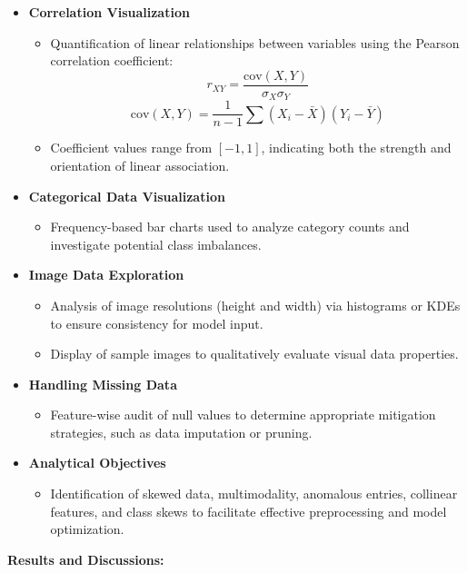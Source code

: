 \documentclass[11pt]{article}
\begin{document}
\begin{itemize}
    \item \textbf{Correlation Visualization}
    \begin{itemize}
        \item Quantification of linear relationships between variables using the Pearson correlation coefficient:
        \[
        r_{XY} = \frac{\text{cov}(X,Y)}{\sigma_X \sigma_Y}
        \]
        \[
        \text{cov}(X,Y) = \frac{1}{n-1} \sum (X_i - \bar{X})(Y_i - \bar{Y})
        \]
        \item Coefficient values range from $[-1, 1]$, indicating both the strength and orientation of linear association.
    \end{itemize}
     
    \item \textbf{Categorical Data Visualization}
    \begin{itemize}
        \item Frequency-based bar charts used to analyze category counts and investigate potential class imbalances.
    \end{itemize}
    \item \textbf{Image Data Exploration}
    \begin{itemize}
        \item Analysis of image resolutions (height and width) via histograms or KDEs to ensure consistency for model input.
        \item Display of sample images to qualitatively evaluate visual data properties.
    \end{itemize}
     
    \item \textbf{Handling Missing Data}
    \begin{itemize}
        \item Feature-wise audit of null values to determine appropriate mitigation strategies, such as data imputation or pruning.
    \end{itemize}
    \item \textbf{Analytical Objectives}
    \begin{itemize}
        \item Identification of skewed data, multimodality, anomalous entries, collinear features, and class skews to facilitate effective preprocessing and model optimization.
    \end{itemize}
\end{itemize}


\vspace{1.5 cm}
\noindent
\textbf{Results and Discussions:}
\end{document}
